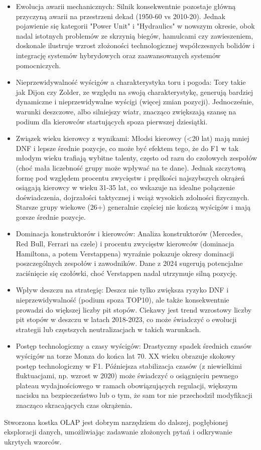 \documentclass[a4paper,12pt]{article}
\begin{document}
\begin{itemize}
  \item Ewolucja awarii mechanicznych: Silnik konsekwentnie pozostaje główną przyczyną awarii na przestrzeni dekad (1950-60 vs 2010-20). Jednak pojawienie się kategorii "Power Unit" i "Hydraulics" w nowszym okresie, obok nadal istotnych problemów ze skrzynią biegów, hamulcami czy zawieszeniem, doskonale ilustruje wzrost złożoności technologicznej współczesnych bolidów i integrację systemów hybrydowych oraz zaawansowanych systemów pomocniczych.
  \item Nieprzewidywalność wyścigów a charakterystyka toru i pogoda: Tory takie jak Dijon czy Zolder, ze względu na swoją charakterystykę, generują bardziej dynamiczne i nieprzewidywalne wyścigi (więcej zmian pozycji). Jednocześnie, warunki deszczowe, albo silniejszy wiatr, znacząco zwiększają szansę na podium dla kierowców startujących spoza pierwszej dziesiątki.
  \item Związek wieku kierowcy z wynikami: Młodsi kierowcy (<20 lat) mają mniej DNF i lepsze średnie pozycje, co może być efektem tego, że do F1 w tak młodym wieku trafiają wybitne talenty, często od razu do czołowych zespołów (choć mała liczebność grupy może wpływać na te dane). Jednak szczytową formę pod względem procentu zwycięstw i prędkości najszybszych okrążeń osiągają kierowcy w wieku 31-35 lat, co wskazuje na idealne połączenie doświadczenia, dojrzałości taktycznej i wciąż wysokich zdolności fizycznych. Starsze grupy wiekowe (26+) generalnie częściej nie kończą wyścigów i mają gorsze średnie pozycje.
  \item Dominacja konstruktorów i kierowców: Analiza konstruktorów (Mercedes, Red Bull, Ferrari na czele) i procentu zwycięstw kierowców (dominacja Hamiltona, a potem Verstappena) wyraźnie pokazuje okresy dominacji poszczególnych zespołów i zawodników. Dane z 2024 sugerują potencjalne zaciśnięcie się czołówki, choć Verstappen nadal utrzymuje silną pozycję.
  \item Wpływ deszczu na strategię: Deszcz nie tylko zwiększa ryzyko DNF i nieprzewidywalność (podium spoza TOP10), ale także konsekwentnie prowadzi do większej liczby pit stopów. Ciekawy jest trend wzrostowy liczby pit stopów w deszczu w latach 2018-2023, co może świadczyć o ewolucji strategii lub częstszych neutralizacjach w takich warunkach.
  \item Postęp technologiczny a czasy wyścigów: Drastyczny spadek średnich czasów wyścigów na torze Monza do końca lat 70. XX wieku obrazuje skokowy postęp technologiczny w F1. Późniejsza stabilizacja czasów (z niewielkimi fluktuacjami, np. wzrost w 2020) może świadczyć o osiągnięciu pewnego plateau wydajnościowego w ramach obowiązujących regulacji, większym nacisku na bezpieczeństwo lub o tym, że sam tor nie przechodził modyfikacji znacząco skracających czas okrążenia.
\end{itemize}

Stworzona kostka OLAP jest dobrym narzędziem do dalszej, pogłębionej eksploracji danych, umożliwiając zadawanie złożonych pytań i odkrywanie ukrytych wzorców.
\end{document}
